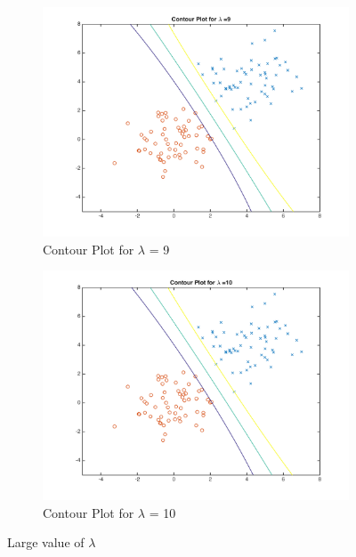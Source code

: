 \documentclass[english]{article}
\begin{document}
\begin{figure}[!htbp]
\begin{subfigure}{0.48\textwidth}
\includegraphics[width=\linewidth]{../plotLambda/plot_9}
\caption{Contour Plot for $\lambda$ = 9} 
\end{subfigure}\hspace*{\fill}
\begin{subfigure}{0.48\textwidth}
\includegraphics[width=\linewidth]{../plotLambda/plot_10}
\caption{Contour Plot for $\lambda$ = 10} \label{fig:b}
\end{subfigure}
\caption{Large value of $\lambda$} \label{fig:1}
\end{figure}
\end{document}
